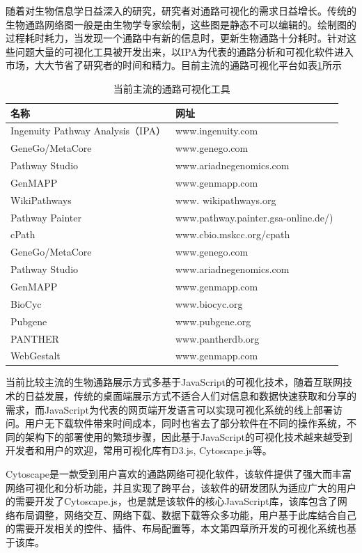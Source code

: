 随着对生物信息学日益深入的研究，研究者对通路可视化的需求日益增长。传统的生物通路网络图一般是由生物学专家绘制，这些图是静态不可以编辑的。绘制图的过程耗时耗力，当发现一个通路中有新的信息时，更新生物通路十分耗时。针对这些问题大量的可视化工具被开发出来，以IPA为代表的通路分析和可视化软件进入市场，大大节省了研究者的时间和精力。目前主流的通路可视化平台如表\ref{table2}所示

\begin{table}[htbp]
  \centering
	\caption[table2]{当前主流的通路可视化工具}
\vspace{0.5em}\wuhao
\begin{tabularx}{1.0\textwidth}{lX}
\toprule[1.5pt]
名称 & 网址 \\
\midrule[1pt]
Ingenuity Pathway Analysis（IPA）	& www.ingenuity.com\\
GeneGo/MetaCore 	& www.genego.com\\
Pathway Studio 	& www.ariadnegenomics.com\\
GenMAPP	       & www.genmapp.com\\
WikiPathways & www. wikipathways.org\\
Pathway Painter	 & www.pathway.painter.gsa-online.de/)\\
cPath	& www.cbio.mskcc.org/cpath\\
GeneGo/MetaCore 	& www.genego.com\\
Pathway Studio 	& www.ariadnegenomics.com\\
GenMAPP	& www.genmapp.com\\
BioCyc	& www.biocyc.org\\
Pubgene	& www.pubgene.org\\
PANTHER	& www.pantherdb.org\\
WebGestalt	& www.genmapp.com\\

\bottomrule[1.5pt]
\end{tabularx}
\label{table2}
\end{table}

当前比较主流的生物通路展示方式多基于JavaScript的可视化技术，随着互联网技术的日益发展，传统的桌面端展示方式不适合人们对信息和数据快速获取和分享的需求，而JavaScript为代表的网页端开发语言可以实现可视化系统的线上部署访问。用户无下载软件带来时间成本，同时也省去了部分软件在不同的操作系统，不同的架构下的部署使用的繁琐步骤，因此基于JavaScript的可视化技术越来越受到开发者和用户的欢迎，常用可视化库有D3.js\cite{bostock2012d3}, Cytoscape.js\cite{franz2015cytoscape}等。


Cytoscape\cite{franz2015cytoscape}是一款受到用户喜欢的通路网络可视化软件，该软件提供了强大而丰富网络可视化和分析功能，并且实现了跨平台，该软件的研发团队为适应广大的用户的需要开发了Cytoscape.js，也是就是该软件的核心JavaScript库，该库包含了网络布局调整，网络交互、网络下载、数据下载等众多功能，用户基于此库结合自己的需要开发相关的控件、插件、布局配置等，本文第四章所开发的可视化系统也基于该库。


